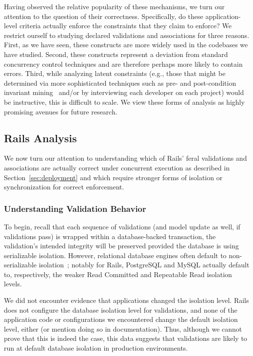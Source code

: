 Having observed the relative popularity of these mechanisms, we turn
our attention to the question of their correctness. Specifically, do
these application-level criteria actually enforce the constraints that
they claim to enforce? We restrict ourself to studying declared
validations and associations for three reasons. First, as we have
seen, these constructs are more widely used in the codebases we have
studied. Second, these constructs represent a deviation from standard
concurrency control techniques and are therefore perhaps more likely
to contain errors. Third, while analyzing latent constraints (e.g.,
those that might be determined via more sophisticated techniques such
as pre- and post-condition invariant
mining~\cite{homeostasis,redblue-new} and/or by interviewing each
developer on each project) would be instructive, this is difficult to
scale. We view these forms of analysis as highly promising avenues for
future research.


\subsection{Rails \IConfluence Analysis}
\label{sec:apps}

We now turn our attention to understanding which of Rails' feral
validations and associations are actually correct under concurrent
execution as described in Section~\ref{sec:deployment} and which
require stronger forms of isolation or synchronization for correct
enforcement.

\subsubsection{Understanding Validation Behavior}

To begin, recall that each sequence of validations (and model update
as well, if validations pass) is wrapped within a database-backed
transaction, the validation's intended integrity will be preserved
provided the database is using serializable isolation. However,
relational database engines often default to non-serializable
isolation~\cite{hat-vldb}; notably for Rails, PostgreSQL and MySQL
actually default to, respectively, the weaker Read Committed and
Repeatable Read isolation levels.

We did not encounter evidence that applications changed the isolation
level. Rails does not configure the database isolation level for
validations, and none of the application code or configurations we
encountered change the default isolation level, either (or mention
doing so in documentation). Thus, although we cannot prove that this
is indeed the case, this data suggests that validations are likely
to run at default database isolation in production environments.

